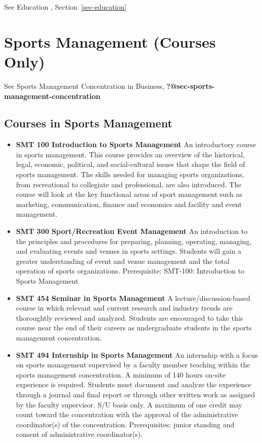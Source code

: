 \documentclass[
  letterpaper,
]{scrbook}
\providecommand{\tightlist}{%
  \setlength{\itemsep}{0pt}\setlength{\parskip}{0pt}}
\begin{document}
See Education , Section~\ref{sec-education}

\hypertarget{sports-management-courses-only}{%
\section{Sports Management (Courses
Only)}\label{sports-management-courses-only}}

See Sports Management Concentration in Business,
\textbf{?@sec-sports-management-concentration}

\hypertarget{courses-in-sports-management}{%
\subsection{Courses in Sports
Management}\label{courses-in-sports-management}}

\begin{itemize}
\tightlist
\item
  \textbf{SMT 100 Introduction to Sports Management} An introductory
  course in sports management. This course provides an overview of the
  historical, legal, economic, political, and social-cultural issues
  that shape the field of sports management. The skills needed for
  managing sports organizations, from recreational to collegiate and
  professional, are also introduced. The course will look at the key
  functional areas of sport management such as marketing, communication,
  finance and economics and facility and event management.\\
\item
  \textbf{SMT 300 Sport/Recreation Event Management} An introduction to
  the principles and procedures for preparing, planning, operating,
  managing, and evaluating events and venues in sports settings.
  Students will gain a greater understanding of event and venue
  management and the total operation of sports organizations.
  Prerequisite: SMT-100: Introduction to Sports Management
\item
  \textbf{SMT 454 Seminar in Sports Management} A
  lecture/discussion-based course in which relevant and current research
  and industry trends are thoroughtly reviewed and analyzed. Students
  are encouraged to take this course near the end of their careers as
  undergraduate students in the sports management concentration.
\item
  \textbf{SMT 494 Internship in Sports Management} An internship with a
  focus on sports management supervised by a faculty member teaching
  within the sports management concentration. A minimum of 140 hours
  on-site experience is required. Students must document and analyze the
  experience through a journal and final report or through other written
  work as assigned by the faculty supervisor. S/U basis only. A maximum
  of one credit may count toward the concentration with the approval of
  the administrative coordinator(s) of the concentration. Prerequisites:
  junior standing and consent of administrative coordinator(s).
\end{itemize}
\end{document}
